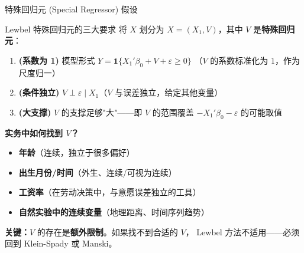 \documentclass[aspectratio=169, 10pt]{beamer}
\begin{document}
\begin{frame}{特殊回归元 (Special Regressor) 假设}

  \begin{definitionbox}{{Lewbel 特殊回归元的三大要求}}
    将 $X$ 划分为 $X = (X_1, V)$，其中 $V$ 是\textbf{特殊回归元}：
    \begin{enumerate}\setlength{\itemsep}{1pt}
      \item \textbf{(系数为 1)} 模型形式 $Y = \mathbf{1}\{X_1'\beta_0 + V + \varepsilon \geq 0\}$
      （$V$ 的系数标准化为 $1$，作为尺度归一）
      \item \textbf{(条件独立)} $V \perp \varepsilon \mid X_1$（$V$ 与误差独立，给定其他变量）
      \item \textbf{(大支撑)} $V$ 的支撑足够"大"——即 $V$ 的范围覆盖 $-X_1'\beta_0 - \varepsilon$ 的可能取值
    \end{enumerate}
  \end{definitionbox}

  \begin{highlightbox}
    \textbf{实务中如何找到 $V$？}
    \begin{itemize}\setlength{\itemsep}{1pt}
      \item \textbf{年龄}（连续，独立于很多偏好）
      \item \textbf{出生月份/时间}（外生、连续/可视为连续）
      \item \textbf{工资率}（在劳动决策中，与意愿误差独立的工具）
      \item \textbf{自然实验中的连续变量}（地理距离、时间序列趋势）
    \end{itemize}
  \end{highlightbox}

  \begin{keybox}
    \textbf{关键：}$V$ 的存在是\textbf{额外限制}。如果找不到合适的 $V$，
    Lewbel 方法不适用——必须回到 Klein-Spady 或 Manski。
  \end{keybox}

\end{frame}
\end{document}
